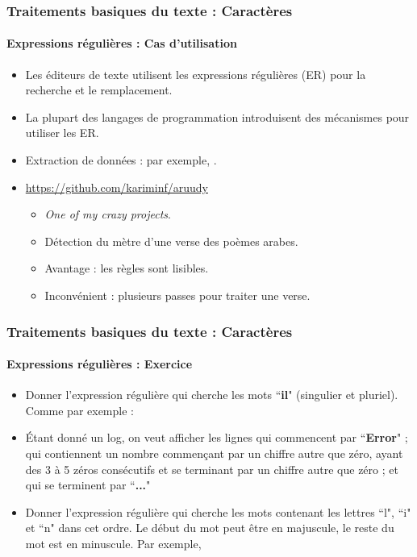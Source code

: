 \documentclass[xcolor=table]{beamer}
\begin{document}
\begin{frame}
\frametitle{Traitements basiques du texte : Caractères}
\framesubtitle{Expressions régulières : Cas d'utilisation}

\begin{itemize}
	\item Les éditeurs de texte utilisent les expressions régulières (ER) pour la recherche et le remplacement.
	\item La plupart des langages de programmation introduisent des mécanismes pour utiliser les ER.
	\item Extraction de données : par exemple, .
	\item \url{https://github.com/kariminf/aruudy}
	\begin{itemize}
		\item \textit{One of my crazy projects}.
		\item Détection du mètre d'une verse des poèmes arabes.
		\item Avantage : les règles sont lisibles.
		\item Inconvénient : plusieurs passes pour traiter une verse.
	\end{itemize}
\end{itemize}

\end{frame}


\begin{frame}
	\frametitle{Traitements basiques du texte : Caractères}
	\framesubtitle{Expressions régulières : Exercice}
	
	\begin{itemize}
		\item Donner l'expression régulière qui cherche les mots ``\textbf{il}" (singulier et pluriel). 
		Comme par exemple : 
		\item Étant donné un log, on veut afficher les lignes qui commencent par ``\textbf{Error}" ; qui contiennent un nombre commençant par un chiffre autre que zéro, ayant des 3 à 5 zéros consécutifs et se terminant par un chiffre autre que zéro ; et qui se terminent par ``\textbf{...}"
		\item Donner l'expression régulière qui cherche les mots contenant les lettres ``l", ``i" et ``n" dans cet ordre. Le début du mot peut être en majuscule, le reste du mot est en minuscule. Par exemple, 
	\end{itemize}
	
\end{frame}
\end{document}
